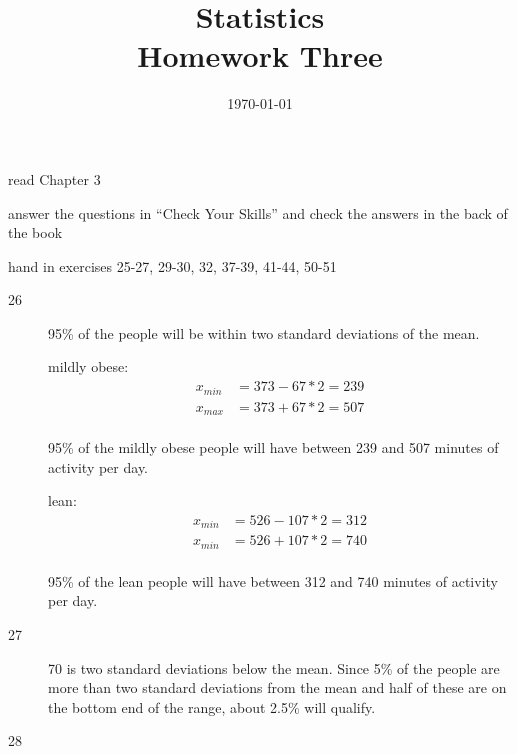\documentclass{exam}
\author{}
\date{\today}
\title{Statistics \\ Homework Three}
\begin{document}
  \maketitle

  \ifprintanswers
  \else
    \begin{itemize*}
      \item read Chapter 3 
      \item answer the questions in ``Check Your Skills'' and check the answers in the back of the book
      \item hand in exercises 25-27, 29-30, 32, 37-39, 41-44, 50-51
    \end{itemize*}
  \fi

  \ifprintanswers
    \begin{description}
      \item[26] 95\% of the people will be within two standard deviations of the mean.  

        mildly obese:
        \begin{align*}
          x_{min} &= 373 - 67 * 2 = 239 \\
          x_{max} &= 373 + 67 * 2 = 507 \\
        \end{align*}

        95\% of the mildly obese people will have between 239 and 507 minutes of activity per day.

        lean:
        \begin{align*}
          x_{min} &= 526 - 107 * 2 = 312 \\
          x_{min} &= 526 + 107 * 2 = 740 \\
        \end{align*}

        95\% of the lean people will have between 312 and 740 minutes of activity per day.

      \item[27]
        70 is two standard deviations below the mean.  Since 5\% of the people are more than two standard deviations
        from the mean and half of these are on the bottom end of the range, about 2.5\% will qualify. 

      \item[28]


\end{description}
\end{document}
